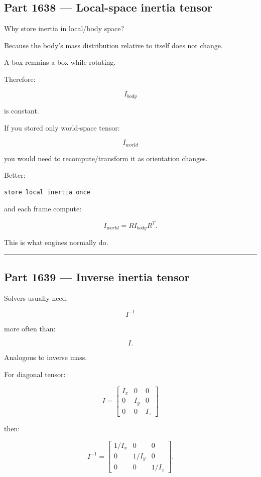 \subsection{Part 1638 --- Local-space inertia tensor}\label{06-engine-ii-ch035-part-1638-local-space-inertia-tensor}

Why store inertia in local/body space?

Because the body's mass distribution relative to itself does not change.

A box remains a box while rotating.

Therefore:

\[
I_{body}
\]

is constant.

If you stored only world-space tensor:

\[
I_{world}
\]

you would need to recompute/transform it as orientation changes.

Better:

\begin{verbatim}
store local inertia once
\end{verbatim}

and each frame compute:

\[
I_{world}
=
RI_{body}R^T.
\]

This is what engines normally do.

\begin{center}\rule{0.5\linewidth}{0.5pt}\end{center}

\subsection{Part 1639 --- Inverse inertia tensor}\label{06-engine-ii-ch035-part-1639-inverse-inertia-tensor}

Solvers usually need:

\[
I^{-1}
\]

more often than:

\[
I.
\]

Analogous to inverse mass.

For diagonal tensor:

\[
I=
\begin{bmatrix}
I_x&0&0\\
0&I_y&0\\
0&0&I_z
\end{bmatrix}
\]

then:

\[
\boxed{
I^{-1}
=
\begin{bmatrix}
1/I_x&0&0\\
0&1/I_y&0\\
0&0&1/I_z
\end{bmatrix}.
}
\]

